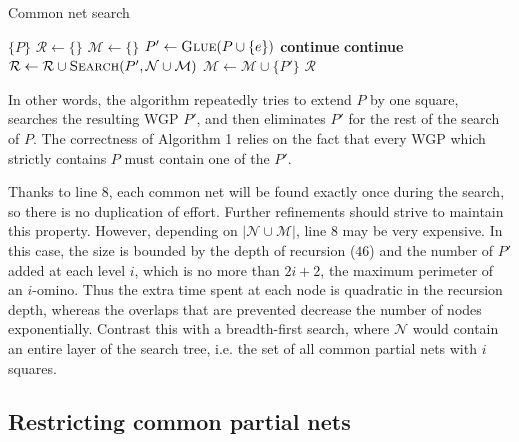\documentclass{article}
\newcommand{\abs}[1]{\left\vert #1 \right\vert}
\begin{document}
\begin{algorithm}
  \caption{Common net search}
  \begin{algorithmic}[1]
    \Return $\{P\}$
    \EndIf
    \State $\mathcal{R} \gets \{\}$
    \State $\mathcal{M} \gets \{\}$
    \State $P' \gets \Call{Glue}{P \cup \{e\}}$
    \textbf{continue}
    \EndIf
    \textbf{continue}
    \EndIf
    \State $\mathcal{R} \gets \mathcal{R} \cup \Call{Search}{P',\mathcal{N} \cup \mathcal{M}}$
    \State $\mathcal{M} \gets \mathcal{M} \cup \{P'\}$
    \EndFor
    \Return $\mathcal{R}$
    \EndFunction
  \end{algorithmic}
\end{algorithm}

In other words, the algorithm repeatedly tries
to extend $P$ by one square,
searches the resulting WGP $P'$,
and then eliminates $P'$ for the rest of the search of $P$.
The correctness of Algorithm 1 relies on the fact that
every WGP which strictly contains $P$
must contain one of the $P'$.

Thanks to line 8,
each common net will be found exactly once during the search,
so there is no duplication of effort.
Further refinements should strive to maintain this property.
However, depending on $\abs{\mathcal{N} \cup \mathcal{M}}$,
line 8 may be very expensive.
In this case, the size is bounded by the depth of recursion ($46$)
and the number of $P'$ added at each level $i$,
which is no more than $2i+2$, the maximum perimeter of an $i$-omino.
Thus the extra time spent at each node
is quadratic in the recursion depth,
whereas the overlaps that are prevented
decrease the number of nodes exponentially.
Contrast this with a breadth-first search,
where $\mathcal{N}$ would contain an entire layer of the search tree,
i.e. the set of all common partial nets with $i$ squares.

\subsection{Restricting common partial nets}
\end{document}
